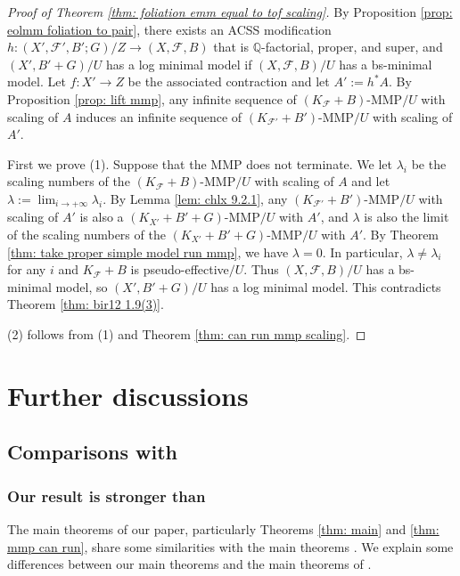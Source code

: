 \documentclass[11pt]{amsart}
\numberwithin{equation}{section}
\newcommand{\Qq}{\mathbb{Q}}
\newcommand{\Ff}{\mathcal{F}}
\theoremstyle{definition}
\theoremstyle{definition}
\theoremstyle{definition}
\begin{document}
\begin{proof}[Proof of Theorem \ref{thm: foliation emm equal to tof scaling}]
By Proposition \ref{prop: eolmm foliation to pair}, there exists an ACSS modification
$h: (X',\Ff',B';G)/Z\rightarrow (X,\Ff,B)$ 
that is $\Qq$-factorial, proper, and super, and $(X',B'+G)/U$ has a log minimal model if $(X,\Ff,B)/U$ has a bs-minimal model. Let $f: X'\rightarrow Z$ be the associated contraction and let $A':=h^*A$. By Proposition \ref{prop: lift mmp}, any infinite sequence of $(K_{\Ff}+B)$-MMP$/U$ with scaling of $A$ induces an infinite sequence of $(K_{\Ff'}+B')$-MMP$/U$ with scaling of $A'$. 

First we prove (1). Suppose that the MMP does not terminate. We let $\lambda_i$ be the scaling numbers of the $(K_{\Ff}+B)$-MMP$/U$ with scaling of $A$ and let $\lambda:=\lim_{i\rightarrow+\infty}\lambda_i$. By Lemma \ref{lem: chlx 9.2.1}, any $(K_{\Ff'}+B')$-MMP$/U$ with scaling of $A'$ is also a $(K_{X'}+B'+G)$-MMP$/U$ with $A'$, and $\lambda$ is also the limit of the scaling numbers of the $(K_{X'}+B'+G)$-MMP$/U$ with $A'$. By Theorem \ref{thm: take proper simple model run mmp}, we have $\lambda=0$. In particular, $\lambda\not=\lambda_i$ for any $i$ and $K_{\Ff}+B$ is pseudo-effective$/U$. Thus $(X,\Ff,B)/U$ has a bs-minimal model, so  $(X',B'+G)/U$ has a log minimal model. This contradicts Theorem \ref{thm: bir12 1.9(3)}. 

(2) follows from (1) and Theorem \ref{thm: can run mmp scaling}.
\end{proof}




\section{Further discussions}\label{sec: problem}

\subsection{Comparisons with \texorpdfstring{\cite{CHLX23}}{}}\label{subsec: lc+klt natural}

\subsubsection{Our result is stronger than \texorpdfstring{\cite{CHLX23}}{}}
The main theorems of our paper, particularly Theorems \ref{thm: main} and \ref{thm: mmp can run}, share some similarities with the main theorems \cite{CHLX23}. We explain some differences between our main theorems and the main theorems of \cite{CHLX23}.
\end{document}

